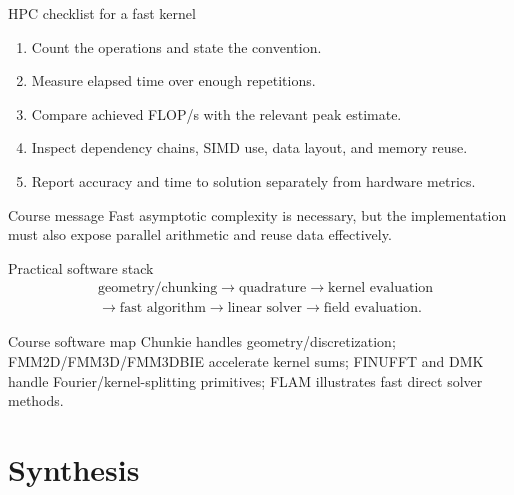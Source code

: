 \documentclass[aspectratio=169,11pt]{beamer}
\begin{document}
\begin{frame}{HPC checklist for a fast kernel}
\small
\begin{enumerate}
  \item Count the operations and state the convention.
  \item Measure elapsed time over enough repetitions.
  \item Compare achieved FLOP/s with the relevant peak estimate.
  \item Inspect dependency chains, SIMD use, data layout, and memory reuse.
  \item Report accuracy and time to solution separately from hardware metrics.
\end{enumerate}
\begin{block}{Course message}
Fast asymptotic complexity is necessary, but the implementation must also
expose parallel arithmetic and reuse data effectively.
\end{block}
\end{frame}

\begin{frame}{Practical software stack}
\small
\[
\begin{aligned}
&\text{geometry/chunking}
\rightarrow
\text{quadrature}
\rightarrow
\text{kernel evaluation}\\
&\rightarrow
\text{fast algorithm}
\rightarrow
\text{linear solver}
\rightarrow
\text{field evaluation}.
\end{aligned}
\]

\begin{block}{Course software map}
Chunkie handles geometry/discretization; FMM2D/FMM3D/FMM3DBIE accelerate
kernel sums; FINUFFT and DMK handle Fourier/kernel-splitting primitives;
FLAM illustrates fast direct solver methods.
\end{block}
\end{frame}

\section{Synthesis}
\end{document}
